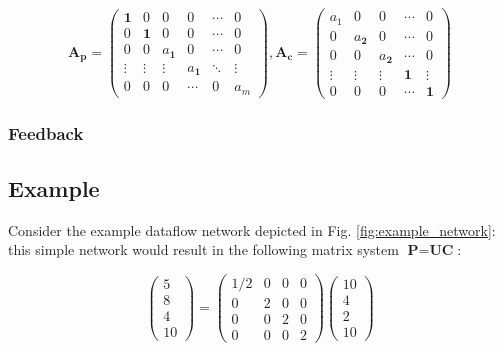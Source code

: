 \begin{equation}
\textbf{A}_{\textbf{p}}=
\begin{pmatrix}
  \textbf{1} & 0 & 0 & 0 & \cdots & 0 \\
  0 & \textbf{1} & 0& 0& \cdots & 0 \\
  0 & 0 & a_{\textbf{1}} & 0 &\cdots & 0 \\
  \vdots  & \vdots  &  \vdots & a_{\textbf{1}}  & \ddots & \vdots  \\
  0 & 0 & 0& \cdots & 0 & a_{m} 
 \end{pmatrix}
,
\textbf{A}_{\textbf{c}}=
\begin{pmatrix}
  a_{1} & 0 & 0 & \cdots & 0 \\
  0 & a_{\textbf{2}} & 0& \cdots & 0 \\
  0 & 0 & a_{\textbf{2}} & \cdots & 0 \\
  \vdots  & \vdots  & \vdots & \textbf{1} & \vdots  \\
  0 & 0 & 0& \cdots & \textbf{1} 
 \end{pmatrix}
\end{equation} 


\subsubsection{Feedback}



\subsection{Example}




Consider the example dataflow network depicted in Fig. \ref{fig:example_network}: this simple network would result in the following matrix system $\textbf{P}=\textbf{U}\textbf{C}$:


\begin{equation}
\begin{pmatrix}
  5  \\
  8  \\
  4  \\
  10
 \end{pmatrix}
=
\begin{pmatrix}
  1/2 & 0 & 0  & 0 \\
  0 & 2 & 0 & 0 \\
  0 & 0 & 2  & 0 \\
  0 & 0 & 0 & 2 
 \end{pmatrix}
 \begin{pmatrix}
  10  \\
  4  \\
  2  \\
  10  
 \end{pmatrix}\end{equation}



